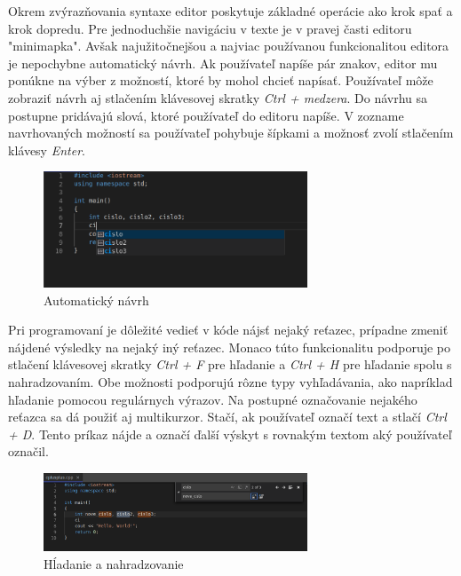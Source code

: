 Okrem zvýrazňovania syntaxe editor poskytuje základné operácie ako krok spať a krok dopredu. Pre
jednoduchšie navigáciu v texte je v pravej časti editoru "minimapka". Avšak najužitočnejšou a
najviac používanou funkcionalitou editora je nepochybne automatický návrh. Ak používateľ napíše pár
znakov, editor mu ponúkne na výber z možností, ktoré by mohol chcieť napísať. Používateľ môže
zobraziť návrh aj stlačením klávesovej skratky \textit{Ctrl + medzera}. Do návrhu sa postupne
pridávajú slová, ktoré používateľ do editoru napíše. V zozname navrhovaných možností sa používateľ
pohybuje šípkami a možnosť zvolí stlačením klávesy \textit{Enter}.
\begin{figure}[H]
\centerline{\includegraphics[width=0.7\textwidth]{images/automaticky_navrh}}
\caption[Automatický návrh]{Automatický návrh}
\label{obr:automaticky_navrh}
\end{figure}

Pri programovaní je dôležité vedieť v kóde nájsť nejaký reťazec, prípadne zmeniť nájdené výsledky na
nejaký iný reťazec. Monaco túto funkcionalitu podporuje po stlačení klávesovej skratky \textit{Ctrl
+ F} pre hľadanie a \textit{Ctrl + H} pre hľadanie spolu s nahradzovaním. Obe možnosti podporujú
rôzne typy vyhľadávania, ako napríklad hľadanie pomocou regulárnych výrazov. Na postupné označovanie
nejakého reťazca sa dá použiť aj multikurzor. Stačí, ak používateľ označí text a stlačí \textit{Ctrl
+ D}. Tento príkaz nájde a označí ďalší výskyt s rovnakým textom aký používateľ označil. 
\begin{figure}[H]
\centerline{\includegraphics[width=0.7\textwidth]{images/hladanie_nahradzovanie}}
\caption[Hĺadanie a nahradzovanie]{Hĺadanie a nahradzovanie}
\label{obr:hladanie_nahradzovanie}
\end{figure}

